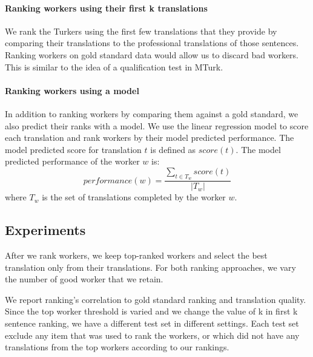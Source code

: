 \documentclass[11pt,letterpaper]{article}
\begin{document}

\paragraph{Ranking workers using their first k translations}
We rank the Turkers using the first few translations that they provide by comparing their translations to the professional translations of those sentences. Ranking workers on gold standard data would allow us to discard bad workers. This is similar to the idea of a qualification test in MTurk. 

\paragraph{Ranking workers using a model}
In addition to ranking workers by comparing them against a gold standard, we also predict their ranks with a model. 
We use the linear regression model to score each translation and rank workers by their model predicted performance.  
The model predicted score for translation $t$ is defined as $score(t)$. The model predicted performance of the worker $w$ is:
\begin{equation}
performance(w) = \frac{\sum_{t \in T_{w}} score (t)}{|T_{w}|}
\end{equation}
where $T_{w} $ is the set of translations completed by the worker $w$. 
 

\subsection{Experiments}

After we rank workers, we keep top-ranked workers and select the best translation only from their translations. For both ranking approaches, we vary the number of good worker that we retain. 

We report ranking's correlation to gold standard ranking and translation quality. Since the top worker threshold is varied and we change the value of k in first k sentence ranking, we have a different test set in different settings. Each test set exclude any item that was used to rank the workers, or which did not have any translations from the top workers according to our rankings. 
\end{document}
